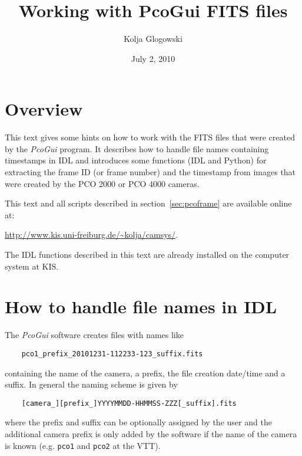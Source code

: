 \documentclass[11pt, a4paper]{scrartcl}
\begin{document}
\addtolength{\parskip}{0.5em}
\setlength{\parindent}{0em}

\title{Working with PcoGui FITS files}
\author{Kolja Glogowski}

\date{July 2, 2010}

\maketitle

\section{Overview}

This text gives some hints on how to work with the FITS files that were created by the \emph{PcoGui} program. It describes how to handle file names containing timestamps in IDL and introduces some functions (IDL and Python) for extracting the frame ID (or frame number) and the timestamp from images that were created by the PCO 2000 or PCO 4000 cameras.

This text and all scripts described in section~\ref{sec:pcoframe} are available online at:
\begin{center}
\url{http://www.kis.uni-freiburg.de/~kolja/camsys/}.
\end{center}

The IDL functions described in this text are already installed on the computer system at KIS.


\section{How to handle file names in IDL}
\label{sec:filenames}

The \emph{PcoGui} software creates files with names like
\begin{verbatim}
    pco1_prefix_20101231-112233-123_suffix.fits
\end{verbatim}
containing the name of the camera, a prefix, the file creation date/time and a suffix. In general the naming scheme is given by
\begin{verbatim}
    [camera_][prefix_]YYYYMMDD-HHMMSS-ZZZ[_suffix].fits
\end{verbatim}
where the prefix and suffix can be optionally assigned by the user and the additional camera prefix is only added by the software if the name of the camera is known (e.g. \texttt{pco1} and \texttt{pco2} at the VTT).
\end{document}
